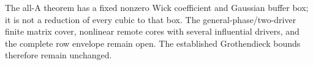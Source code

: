 The all-A theorem has a fixed nonzero Wick coefficient and Gaussian
buffer box; it is not a reduction of every cubic to that box. The
general-phase/two-driver finite matrix cover, nonlinear remote cores
with several influential drivers, and the complete row envelope remain
open. The established Grothendieck bounds therefore remain unchanged.
